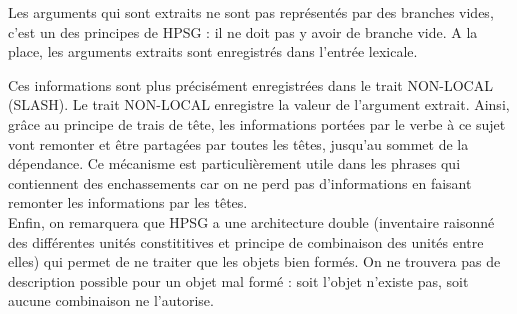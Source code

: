 Les arguments qui sont extraits ne sont pas représentés par des branches vides, c'est un des principes de HPSG : il ne doit pas y avoir de branche vide.
A la place, les arguments extraits sont enregistrés dans l'entrée lexicale.

Ces informations sont plus précisément enregistrées dans le trait NON-LOCAL (SLASH).
Le trait NON-LOCAL enregistre la valeur de l'argument extrait.
Ainsi, grâce au principe de trais de tête, les informations portées par le verbe à ce sujet vont remonter et être partagées par toutes les têtes, jusqu'au sommet de la dépendance.
Ce mécanisme est particulièrement utile dans les phrases qui contiennent des enchassements car on ne perd pas d'informations en faisant remonter les informations par les têtes.\\

Enfin, on remarquera que HPSG a une architecture double (inventaire raisonné des différentes unités constititives et principe de combinaison des unités entre elles) qui permet de ne traiter que les objets bien formés.
On ne trouvera pas de description possible pour un objet mal formé : soit l'objet n'existe pas, soit aucune combinaison ne l'autorise.
